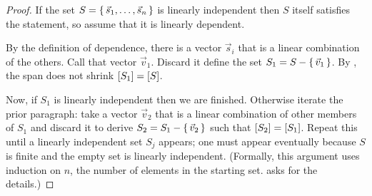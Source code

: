\begin{proof}
If the set  \( S=\mbox{$\{\, \vec{s}_1,\dots,\vec{s}_n\,\}$} \) is linearly independent
then $S$ itself satisfies the statement, so 
assume that it is linearly dependent.

By the definition of dependence,
there is a vector \( \vec{s}_i \) that is a linear combination of
the others.
Call that vector \( \vec{v}_1 \).
Discard it\Dash
define the set \( S_1=S-\mbox{$\{\,\vec{v}_1\,\}$} \).
By , the span does not
shrink \( \relax [S_1\relax ]=\relax [S\relax ] \).

Now, if \( S_1 \) is linearly independent then we are finished.
Otherwise iterate the prior paragraph: 
take a vector $\vec{v}_2$ 
that is a linear combination of
other members of $S_1$ and discard it
to derive \( S_2=S_1-\mbox{$\{\,\vec{v}_2\,\}$} \)
such that \( \relax [S_2\relax ]=\relax [S_1\relax ] \).
Repeat this until a linearly independent set $S_j$ appears;
one must appear eventually because \( S \) is finite
and the empty set is linearly independent.
(Formally, this argument uses
induction on $n$, the number of elements in the starting set.
 asks for the details.)
\end{proof}

